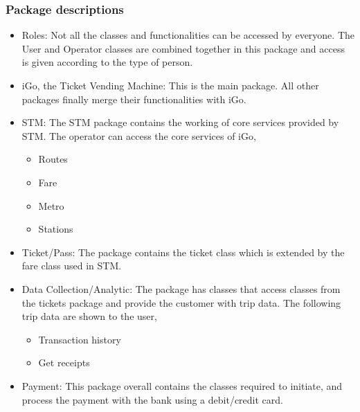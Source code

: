 \documentclass{article}
\begin{document}
\subsubsection{Package descriptions}
\begin{itemize}
    \item Roles: Not all the classes and functionalities can be accessed by everyone. The User and Operator classes are combined together in this package and access is given according to the type of person.
    \item iGo, the Ticket Vending Machine: This is the main package. All other packages finally merge their functionalities with iGo. 
    \item STM: The STM package contains the working of core services provided by STM. The operator can access the core services of iGo, 
    \begin{itemize}
        \item Routes
        \item Fare
        \item Metro
        \item Stations
    \end{itemize}
    \item Ticket/Pass: The package contains the ticket class which is extended by the fare class used in STM. 
    \item Data Collection/Analytic: The package has classes that access classes from the tickets package and provide the customer with trip data. The following trip data are shown to the user, 
    \begin{itemize}
        \item Transaction history
        \item Get receipts
    \end{itemize}
    \item Payment: This package overall contains the classes required to initiate, and process the payment with the bank using a debit/credit card. 
\end{itemize}
\end{document}
